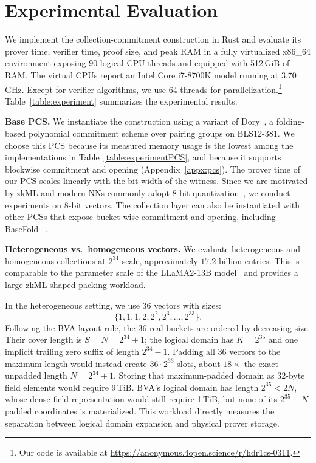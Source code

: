 
\section{Experimental Evaluation}
\label{sec:experiments}

We implement the collection-commitment construction in Rust and evaluate its
prover time, verifier time, proof size, and peak RAM in a fully virtualized
x86\_64 environment exposing 90 logical CPU threads and equipped with
512\,GiB of RAM.
The virtual CPUs report an Intel Core i7-8700K model running at 3.70\,GHz.
Except for verifier algorithms, we use 64 threads for parallelization.\footnote{
Our code is available at \url{https://anonymous.4open.science/r/hdr1cs-0311}.
}
Table~\ref{table:experiment} summarizes the experimental results.

\mysmallskip
{\bf Base PCS.}
We instantiate the construction using a variant of Dory~\cite{tcc/Lee21},
a folding-based polynomial commitment scheme over pairing groups on BLS12-381.
We choose this PCS because its measured memory usage is the lowest among the
implementations in Table~\ref{table:experimentPCS}, and because it supports
blockwise commitment and opening (Appendix~\ref{appx:pcs}).
The prover time of our PCS scales linearly with the bit-width of the witness.
Since we are motivated by zkML and modern NNs commonly adopt 8-bit quantization~\cite[\S~1]{corr/micikevicius22},
we conduct experiments on 8-bit vectors.
The collection layer can also be instantiated with other PCSs that expose
bucket-wise commitment and opening, including BaseFold
~\cite{crypto/ZeilbergerCF24}.

\mysmallskip
{\bf Heterogeneous vs.\ homogeneous vectors.}
We evaluate heterogeneous and homogeneous collections at $2^{34}$ scale,
approximately $17.2$ billion entries.  This is comparable to the parameter scale
of the LLaMA2-13B model~\cite{arxiv/Llama23} and provides a large zkML-shaped
packing workload.

In the heterogeneous setting, we use $36$ vectors with sizes:
\[
  \{1, 1, 1, 2, 2^2, 2^3, \ldots, 2^{33}\}.
\]
Following the BVA layout rule, the $36$ real buckets are ordered by decreasing
size.  Their cover length is $S=N=2^{34}+1$; the logical domain has
$K=2^{35}$ and one implicit trailing zero suffix of length $2^{34}-1$.
Padding all $36$ vectors to the maximum length would instead create
$36\cdot2^{33}$ slots, about $18\times$ the exact unpadded length
$N=2^{34}+1$.  Storing that maximum-padded domain as 32-byte field elements
would require 9\,TiB.  BVA's logical domain has length $2^{35}<2N$, whose dense
field representation would still require 1\,TiB, but none of its $2^{35}-N$
padded coordinates is materialized.  This workload directly measures the
separation between logical domain expansion and physical prover storage.

